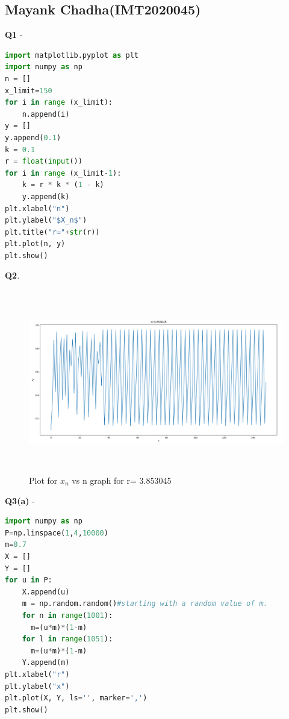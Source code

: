 \documentclass[11pt]{scrartcl} %
\begin{document}
\subsection{Mayank Chadha(IMT2020045)}
\textbf{Q1} -
\begin{lstlisting}[language=Python, caption= Code for plotting $X_n$ vs n graph for a given r]
import matplotlib.pyplot as plt
import numpy as np
n = []
x_limit=150
for i in range (x_limit):
    n.append(i)
y = []
y.append(0.1)
k = 0.1
r = float(input())
for i in range (x_limit-1):
    k = r * k * (1 - k)
    y.append(k)
plt.xlabel("n")
plt.ylabel("$X_n$")
plt.title("r="+str(r))
plt.plot(n, y)
plt.show() 
\end{lstlisting}
\textbf{Q2}.
\begin{figure}[h] %
	\centering
	\includegraphics[width=12cm, height=8cm]{Mayank.png} %
	\caption {Plot for $x_n$ vs n graph for r= 3.853045}
\end{figure}
\newpage
\textbf{Q3(a)} -
\begin{lstlisting}[language=Python, caption= Bifurcation diagram]
import numpy as np
P=np.linspace(1,4,10000)
m=0.7
X = []
Y = []
for u in P:
    X.append(u)
    m = np.random.random()#starting with a random value of m.
    for n in range(1001):
      m=(u*m)*(1-m)
    for l in range(1051):
      m=(u*m)*(1-m)
    Y.append(m)
plt.xlabel("r")
plt.ylabel("x")
plt.plot(X, Y, ls='', marker=',')
plt.show()
\end{lstlisting}
\newpage
\end{document}
